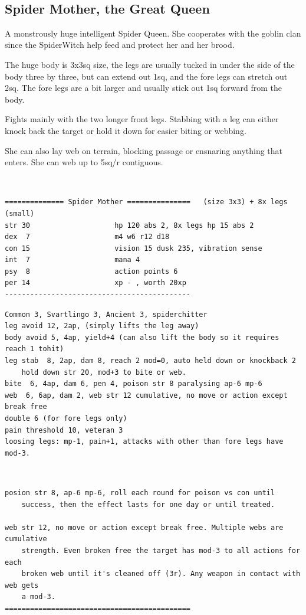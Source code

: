 \


\goodbreak
\subsection*{Spider Mother, the Great Queen}

A monstrously huge intelligent Spider Queen. She cooperates with the goblin clan since the SpiderWitch help feed and protect her and her brood.

The huge body is 3x3sq size, the legs are usually tucked in under the side of the body three by three, but can extend out 1sq, and the fore legs can stretch out 2sq. The fore legs are a bit larger and usually stick out 1sq forward from the body.

Fights mainly with the two longer front legs. Stabbing with a leg can either knock back the target or hold it down for easier biting or webbing.

She can also lay web on terrain, blocking passage or ensnaring anything that enters. She can web up to 5sq/r contiguous.

\

\small \begin{samepage} \begin{verbatim}
============== Spider Mother ===============   (size 3x3) + 8x legs (small)
str 30                    hp 120 abs 2, 8x legs hp 15 abs 2
dex  7                    m4 w6 r12 d18
con 15                    vision 15 dusk 235, vibration sense
int  7                    mana 4
psy  8                    action points 6
per 14                    xp - , worth 20xp
--------------------------------------------
\end{verbatim} \goodbreak \begin{verbatim}
Common 3, Svartlingo 3, Ancient 3, spiderchitter
leg avoid 12, 2ap, (simply lifts the leg away)
body avoid 5, 4ap, yield+4 (can also lift the body so it requires reach 1 tohit)
leg stab  8, 2ap, dam 8, reach 2 mod=0, auto held down or knockback 2
    hold down str 20, mod+3 to bite or web.
bite  6, 4ap, dam 6, pen 4, poison str 8 paralysing ap-6 mp-6
web  6, 6ap, dam 2, web str 12 cumulative, no move or action except break free
double 6 (for fore legs only)
pain threshold 10, veteran 3
loosing legs: mp-1, pain+1, attacks with other than fore legs have mod-3.
\end{verbatim} \end{samepage}   \   \goodbreak \begin{samepage} \begin{verbatim}
posion str 8, ap-6 mp-6, roll each round for poison vs con until
    success, then the effect lasts for one day or until treated.

web str 12, no move or action except break free. Multiple webs are cumulative
    strength. Even broken free the target has mod-3 to all actions for each
    broken web until it's cleaned off (3r). Any weapon in contact with web gets
    a mod-3.
============================================
\end{verbatim} \end{samepage} \normalsize

